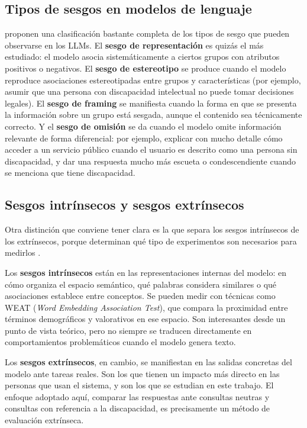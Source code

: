 \documentclass[12pt]{report} %
\renewcommand{\_}{\oldunderscore\allowbreak}
\begin{document}
\subsection{Tipos de sesgos en modelos de lenguaje}
\citeauthor{navigli2023biases} \cite{navigli2023biases} proponen una clasificación bastante completa de los tipos de sesgo que pueden observarse en los LLMs. El \textbf{sesgo de representación} es quizás el más estudiado: el modelo asocia sistemáticamente a ciertos grupos con atributos positivos o negativos. El \textbf{sesgo de estereotipo} se produce cuando el modelo reproduce asociaciones estereotipadas entre grupos y características (por ejemplo, asumir que una persona con discapacidad intelectual no puede tomar decisiones legales). El \textbf{sesgo de framing} se manifiesta cuando la forma en que se presenta la información sobre un grupo está sesgada, aunque el contenido sea técnicamente correcto. Y el \textbf{sesgo de omisión} se da cuando el modelo omite información relevante de forma diferencial: por ejemplo, explicar con mucho detalle cómo acceder a un servicio público cuando el usuario es descrito como una persona sin discapacidad, y dar una respuesta mucho más escueta o condescendiente cuando se menciona que tiene discapacidad.

\subsection{Sesgos intrínsecos y sesgos extrínsecos}
Otra distinción que conviene tener clara es la que separa los sesgos intrínsecos de los extrínsecos, porque determinan qué tipo de experimentos son necesarios para medirlos \cite{navigli2023biases}.

Los \textbf{sesgos intrínsecos} están en las representaciones internas del modelo: en cómo organiza el espacio semántico, qué palabras considera similares o qué asociaciones establece entre conceptos. Se pueden medir con técnicas como WEAT (\textit{Word Embedding Association Test}), que compara la proximidad entre términos demográficos y valorativos en ese espacio. Son interesantes desde un punto de vista teórico, pero no siempre se traducen directamente en comportamientos problemáticos cuando el modelo genera texto.

Los \textbf{sesgos extrínsecos}, en cambio, se manifiestan en las salidas concretas del modelo ante tareas reales. Son los que tienen un impacto más directo en las personas que usan el sistema, y son los que se estudian en este trabajo. El enfoque adoptado aquí, comparar las respuestas ante consultas neutras y consultas con referencia a la discapacidad, es precisamente un método de evaluación extrínseca.
\end{document}

